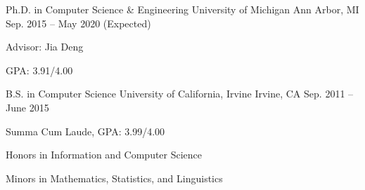 \begin{cventries}
  \cventry
    {Ph.D. in Computer Science \& Engineering}
    {University of Michigan}
    {Ann Arbor, MI}
    {Sep. 2015 -- May 2020 (Expected)}
    {
      \begin{cvitems}
        \item {Advisor: Jia Deng}
        \item {GPA: 3.91/4.00}
      \end{cvitems}
    }
  \cventry
    {B.S. in Computer Science}
    {University of California, Irvine}
    {Irvine, CA}
    {Sep. 2011 -- June 2015}
    {
      \begin{cvitems}
        \item {Summa Cum Laude, GPA: 3.99/4.00}
        \item {Honors in Information and Computer Science}
        \item {Minors in Mathematics, Statistics, and Linguistics}
      \end{cvitems}
    }
\end{cventries}
